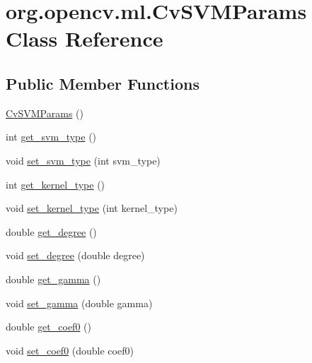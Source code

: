 \hypertarget{classorg_1_1opencv_1_1ml_1_1_cv_s_v_m_params}{}\section{org.\+opencv.\+ml.\+Cv\+S\+V\+M\+Params Class Reference}
\label{classorg_1_1opencv_1_1ml_1_1_cv_s_v_m_params}
\subsection*{Public Member Functions}
\begin{DoxyCompactItemize}
\item 
\mbox{\hyperlink{classorg_1_1opencv_1_1ml_1_1_cv_s_v_m_params_a49f85755379935bb245135021158de9a}{Cv\+S\+V\+M\+Params}} ()
\item 
int \mbox{\hyperlink{classorg_1_1opencv_1_1ml_1_1_cv_s_v_m_params_a2fb1cafcf56f3be8bd6ca7ce9f100666}{get\+\_\+svm\+\_\+type}} ()
\item 
void \mbox{\hyperlink{classorg_1_1opencv_1_1ml_1_1_cv_s_v_m_params_aa8f93a5bec36f256e93e78c56eae627b}{set\+\_\+svm\+\_\+type}} (int svm\+\_\+type)
\item 
int \mbox{\hyperlink{classorg_1_1opencv_1_1ml_1_1_cv_s_v_m_params_a5ede63c824024fe44c32dd6bdc3c5c12}{get\+\_\+kernel\+\_\+type}} ()
\item 
void \mbox{\hyperlink{classorg_1_1opencv_1_1ml_1_1_cv_s_v_m_params_ac2728b1715ac90fcf45b7b6f25cd25e0}{set\+\_\+kernel\+\_\+type}} (int kernel\+\_\+type)
\item 
double \mbox{\hyperlink{classorg_1_1opencv_1_1ml_1_1_cv_s_v_m_params_a728f1ae2c78723dc8bd6e8b64f28a26c}{get\+\_\+degree}} ()
\item 
void \mbox{\hyperlink{classorg_1_1opencv_1_1ml_1_1_cv_s_v_m_params_a7d7e8af5fb1947b29548df05ce49fc76}{set\+\_\+degree}} (double degree)
\item 
double \mbox{\hyperlink{classorg_1_1opencv_1_1ml_1_1_cv_s_v_m_params_a510bcc4d51b0484053cc7fe2ee74e075}{get\+\_\+gamma}} ()
\item 
void \mbox{\hyperlink{classorg_1_1opencv_1_1ml_1_1_cv_s_v_m_params_abf8049f6bf695e3ae3811c417af3b6a4}{set\+\_\+gamma}} (double gamma)
\item 
double \mbox{\hyperlink{classorg_1_1opencv_1_1ml_1_1_cv_s_v_m_params_ac5356f51d759deedf4d6e59e873c42cd}{get\+\_\+coef0}} ()
\item 
void \mbox{\hyperlink{classorg_1_1opencv_1_1ml_1_1_cv_s_v_m_params_afec87d93796ed192d457230731a9bd03}{set\+\_\+coef0}} (double coef0)

\end{DoxyCompactItemize}
